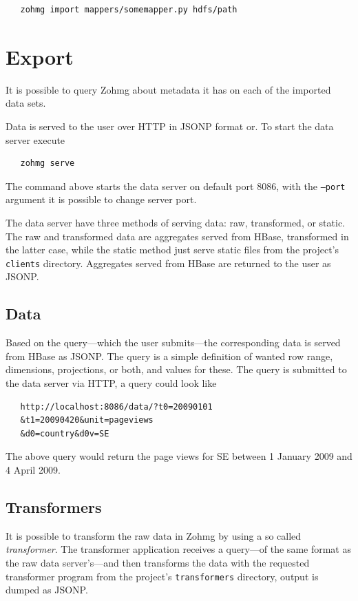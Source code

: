 \begin{verbatim}
   zohmg import mappers/somemapper.py hdfs/path
\end{verbatim}


\section*{Export}

It is possible to query Zohmg about metadata it has on each of the imported
data sets.

Data is served to the user over HTTP in JSONP format or. To start the data
server execute

\begin{verbatim}
   zohmg serve
\end{verbatim}

The command above starts the data server on default port 8086, with the
\texttt{--port} argument it is possible to change server port.

The data server have three methods of serving data: raw, transformed, or
static. The raw and transformed data are aggregates served from HBase,
transformed in the latter case, while the static method just serve static
files from the project's \texttt{clients} directory. Aggregates served from
HBase are returned to the user as JSONP.


\subsection*{Data}

Based on the query---which the user submits---the corresponding data is
served from HBase as JSONP. The query is a simple definition of wanted row
range, dimensions, projections, or both, and values for these. The query is
submitted to the data server via HTTP, a query could look like

\begin{verbatim}
   http://localhost:8086/data/?t0=20090101
   &t1=20090420&unit=pageviews
   &d0=country&d0v=SE
\end{verbatim}

The above query would return the page views for SE between 1 January
2009 and 4 April 2009.


\subsection*{Transformers}

It is possible to transform the raw data in Zohmg by using a so called
\textit{transformer}. The transformer application receives a query---of the same
format as the raw data server's---and then transforms the data with the
requested transformer program from the project's \texttt{transformers}
directory, output is dumped as JSONP.

